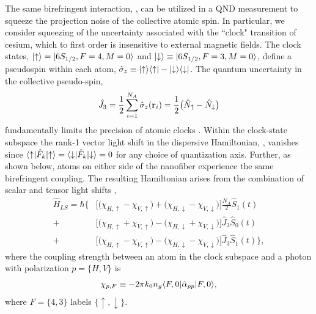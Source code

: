 \documentclass[preprint,aps,pra,onecolumn]{revtex4-1} %
\newcommand{\error}[1]{{\color{red} #1}}
\begin{document}
The same birefringent interaction, , can be utilized in a QND measurement to squeeze the projection noise of the collective atomic spin.  In particular, we consider squeezing of the uncertainty associated with the ``clock" transition of cesium, which to first order is insensitive to external magnetic fields.  The clock states, $\lvert{\uparrow}\rangle = \lvert{6S_{1/2}, F=4, M=0}\rangle$ and $\lvert{\downarrow}\rangle \equiv \lvert{6S_{1/2}, F=3, M=0}\rangle$, define a pseudospin within each atom, $\hat{\sigma}_z \equiv \lvert{\uparrow}\rangle\langle{\uparrow}\rvert - \lvert{\downarrow}\rangle\langle{\downarrow}\rvert$.  The quantum uncertainty in the collective pseudo-spin,
	\begin{align}
		\hat{J}_3 = \frac{1}{2} \sum_{i=1}^{N_A} \hat{\sigma}_z(\mathbf{r}_i) = \frac{1}{2} \big( \hat{N}_\uparrow - \hat{N}_\downarrow \big)
	\end{align}
fundamentally limits the precision of atomic clocks \cite{wineland_spin_1992}. Within the clock-state subspace the rank-1 vector light shift in the dispersive Hamiltonian, , vanishes since $\langle{\uparrow}\rvert \hat{F}_k \lvert{\uparrow}\rangle =\langle{\downarrow}\rvert \hat{F}_k \lvert{\downarrow}\rangle = 0$ for any choice of quantization axis. Further, as shown below, atoms on either side of the nanofiber experience the same birefringent coupling. The resulting Hamiltonian arises from the combination of scalar and tensor light shifts \cite{chaudhury_continuous_2006},
	\begin{align} \label{Eq::ClockHamiltonian}
		\hat{H}_{LS} = \hbar \Big\{ %
		 & \big[ \big( \chi_{H, \uparrow} - \chi_{V,\uparrow} \big) + \big(\chi_{H,\downarrow} - \chi_{V,\downarrow} \big)\big]  \frac{N_A}{2}\hat{S}_1(t)  \\
		+ & \big[ \big( \chi_{H,\uparrow} +\chi_{V,\uparrow} \big) - \big( \chi_{H,\downarrow} + \chi_{V,\downarrow}\big) \big] \hat{J}_3 \hat{S}_0(t) \nonumber \\
		+ & \big[  \big( \chi_{H, \uparrow} - \chi_{V,\uparrow} \big) - \big(\chi_{H,\downarrow} - \chi_{V,\downarrow} \big) \big]  \hat{J}_3 \hat{S}_1(t) \Big\}, \nonumber
	\end{align}
where the coupling strength between an atom in the clock subspace and a photon with polarization $p = \{H,V\}$ is
	\begin{equation} \label{Eq::ClockCouplingStrength}
		\chi_{p,F} \equiv - 2\pi k_0 n_g  \langle{F,0}\rvert\hat{\alpha}_{pp}  \lvert{F,0}\rangle,
	\end{equation}
where $F = \{4,3\}$ labels $\{\uparrow,\downarrow\}$.
\end{document}

